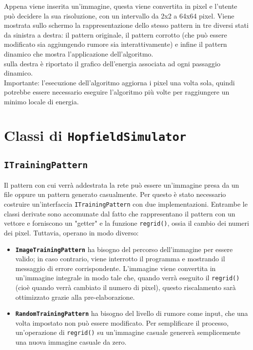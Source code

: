 \documentclass{article}
\begin{document}
Appena viene inserita un'immagine, questa viene convertita in pixel e l'utente può decidere la sua risoluzione, con un intervallo da 2x2 a 64x64 pixel. Viene mostrata sullo schermo la rappresentazione dello stesso pattern in tre diversi stati da sinistra a destra: il pattern originale, il pattern corrotto (che può essere modificato sia aggiungendo rumore sia interattivamente) e infine il pattern dinamico che mostra l'applicazione dell'algoritmo.
\\
sulla destra è riportato il grafico dell'energia associata ad ogni passaggio dinamico.
\\
Importante: l'esecuzione dell'algoritmo aggiorna i pixel una volta sola, quindi potrebbe essere necessario eseguire l'algoritmo più volte per raggiungere un minimo locale di energia.

\section{Classi di \texttt{HopfieldSimulator}}
\subsection{\texttt{ITrainingPattern}}
Il pattern con cui verrà addestrata la rete può essere un'immagine presa da un file oppure un pattern generato casualmente. Per questo è stato necessario costruire un'interfaccia \texttt{ITrainingPattern} con due implementazioni. Entrambe le classi derivate sono accomunate dal fatto che rappresentano il pattern con un vettore e forniscono un "getter" e la funzione \texttt{regrid()}, ossia il cambio dei numeri dei pixel. Tuttavia, operano in modo diverso:
\begin{itemize}
    \item \textbf{\texttt{ImageTrainingPattern}} ha bisogno del percorso dell'immagine per essere valido; in caso contrario, viene interrotto il programma e mostrando il messaggio di errore corrispondente. L'immagine viene convertita in un'immagine integrale in modo tale che, quando verrà eseguito il \texttt{regrid()} (cioè quando verrà cambiato il numero di pixel), questo riscalamento sarà ottimizzato grazie alla pre-elaborazione.
    \item \textbf{\texttt{RandomTrainingPattern}} ha bisogno del livello di rumore come input, che una volta impostato non può essere modificato. Per semplificare il processo, un'operazione di \texttt{regrid()} su un'immagine casuale genererà semplicemente una nuova immagine casuale da zero.
\end{itemize}
\end{document}
